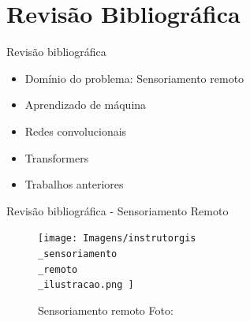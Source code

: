 \documentclass[8pt]{beamer}
\begin{document}
\section{Revisão Bibliográfica} 
\begin{frame}{Revisão bibliográfica }
\begin{itemize}
    \item Domínio do problema: Sensoriamento remoto
    \item Aprendizado de máquina
    \item Redes convolucionais
    \item Transformers
    \item Trabalhos anteriores
\end{itemize}

\end{frame}


\begin{frame}{Revisão bibliográfica - Sensoriamento Remoto}
    \begin{figure}[!ht]
        \centering
        \texttt{[image: 
            Imagens/instrutorgis\\\_sensoriamento\\\_remoto\\\_ilustracao.png
        ]}
        \caption{Sensoriamento remoto Foto:\cite{InstrutorGIS}}
    \label{fig:sensoriamento}
    \end{figure}
    \end{frame}
\end{document}
